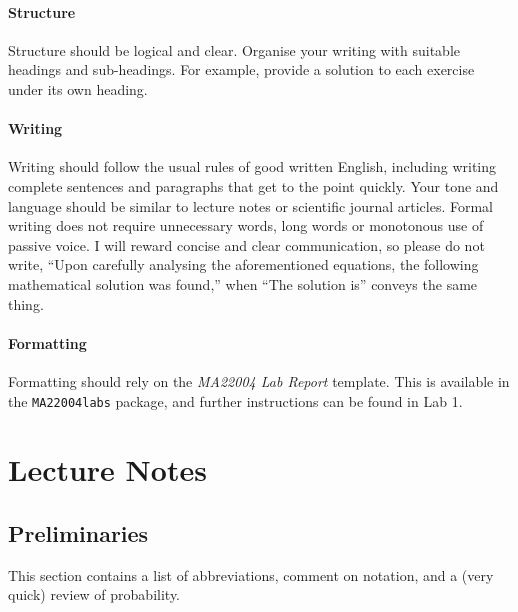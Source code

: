 \documentclass[
  a4paper,
  DIV=11,
  numbers=noendperiod,
  oneside]{scrreprt}
\theoremstyle{plain}
\theoremstyle{definition}
\theoremstyle{definition}
\theoremstyle{definition}
\theoremstyle{plain}
\theoremstyle{remark}
\begin{document}
\subsection*{Structure}\label{w-structure}

Structure should be logical and clear. Organise your writing with
suitable headings and sub-headings. For example, provide a solution to
each exercise under its own heading.

\subsection*{Writing}\label{w-eng}

Writing should follow the usual rules of good written English, including
writing complete sentences and paragraphs that get to the point quickly.
Your tone and language should be similar to lecture notes or scientific
journal articles. Formal writing does not require unnecessary words,
long words or monotonous use of passive voice. I will reward concise and
clear communication, so please do not write, ``Upon carefully analysing
the aforementioned equations, the following mathematical solution was
found,'' when ``The solution is'' conveys the same thing.

\subsection*{Formatting}\label{w-format}

Formatting should rely on the \emph{MA22004 Lab Report} template. This
is available in the \texttt{MA22004labs} package, and further
instructions can be found in Lab 1.

\part{Lecture Notes}

\chapter*{Preliminaries}\label{preliminaries}


This section contains a list of abbreviations, comment on notation, and
a (very quick) review of probability.
\end{document}
